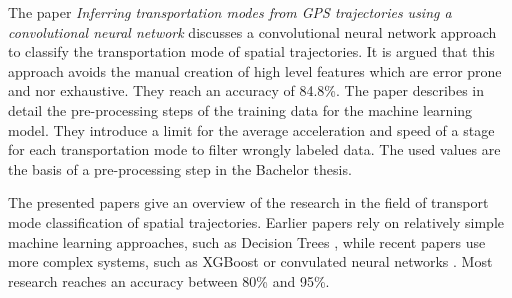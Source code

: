 The paper \textit{Inferring transportation modes from GPS trajectories using a convolutional neural network} \cite{Dabiri2018} discusses a convolutional neural network approach to classify the transportation mode of spatial trajectories. It is argued that this approach avoids the manual creation of high level features which are error prone and nor exhaustive. They reach an accuracy of 84.8\%.\newline
The paper describes in detail the pre-processing steps of the training data for the machine learning model. They introduce a limit for the average acceleration and speed of a stage for each transportation mode to filter wrongly labeled data. The used values are the basis of a pre-processing step in the Bachelor thesis.

The presented papers give an overview of the research in the field of transport mode classification of spatial trajectories. Earlier papers rely on relatively simple machine learning approaches, such as Decision Trees \cite{Zheng2008}, while recent papers use more complex systems, such as XGBoost \cite{Xiao2017} or convulated neural networks \cite{Dabiri2018}. Most research reaches an accuracy between 80\% and 95\%.  
